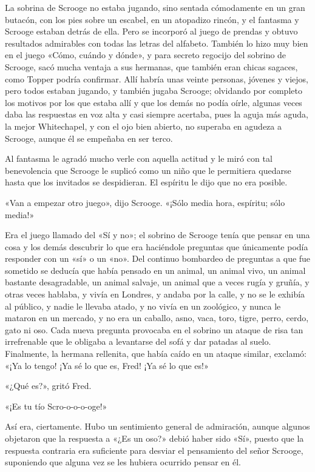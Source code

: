 \documentclass{novela}
\begin{document}
 La sobrina de Scrooge no estaba jugando, sino sentada cómodamente en un gran butacón, con los pies sobre un escabel, en un atopadizo rincón, y el fantasma y Scrooge estaban detrás de ella. Pero se incorporó al juego de prendas y obtuvo resultados admirables con todas las letras del alfabeto. También lo hizo muy bien en el juego «Cómo, cuándo y dónde», y para secreto regocijo del sobrino de Scrooge, sacó mucha ventaja a sus hermanas, que también eran chicas sagaces, como Topper podría confirmar. Allí habría unas veinte personas, jóvenes y viejos, pero todos estaban jugando, y también jugaba Scrooge; olvidando por completo los motivos por los que estaba allí y que los demás no podía oírle, algunas veces daba las respuestas en voz alta y casi siempre acertaba, pues la aguja más aguda, la mejor Whitechapel, y con el ojo bien abierto, no superaba en agudeza a Scrooge, aunque él se empeñaba en ser terco.

 Al fantasma le agradó mucho verle con aquella actitud y le miró con tal benevolencia que Scrooge le suplicó como un niño que le permitiera quedarse hasta que los invitados se despidieran. El espíritu le dijo que no era posible.

 «Van a empezar otro juego», dijo Scrooge. «¡Sólo media hora, espíritu; sólo media!»

 Era el juego llamado del «Sí y no»; el sobrino de Scrooge tenía que pensar en una cosa y los demás descubrir lo que era haciéndole preguntas que únicamente podía responder con un «sí» o un «no». Del continuo bombardeo de preguntas a que fue sometido se deducía que había pensado en un animal, un animal vivo, un animal bastante desagradable, un animal salvaje, un animal que a veces rugía y gruñía, y otras veces hablaba, y vivía en Londres, y andaba por la calle, y no se le exhibía al público, y nadie le llevaba atado, y no vivía en un zoológico, y nunca le mataron en un mercado, y no era un caballo, asno, vaca, toro, tigre, perro, cerdo, gato ni oso. Cada nueva pregunta provocaba en el sobrino un ataque de risa tan irrefrenable que le obligaba a levantarse del sofá y dar patadas al suelo. Finalmente, la hermana rellenita, que había caído en un ataque similar, exclamó: «¡Ya lo tengo! ¡Ya sé lo que es, Fred! ¡Ya sé lo que es!»

 «¿Qué es?», gritó Fred.

 «¡Es tu tío Scro-o-o-o-oge!»

 Así era, ciertamente. Hubo un sentimiento general de admiración, aunque algunos objetaron que la respuesta a «¿Es un oso?» debió haber sido «Sí», puesto que la respuesta contraria era suficiente para desviar el pensamiento del señor Scrooge, suponiendo que alguna vez se les hubiera ocurrido pensar en él.
\end{document}
